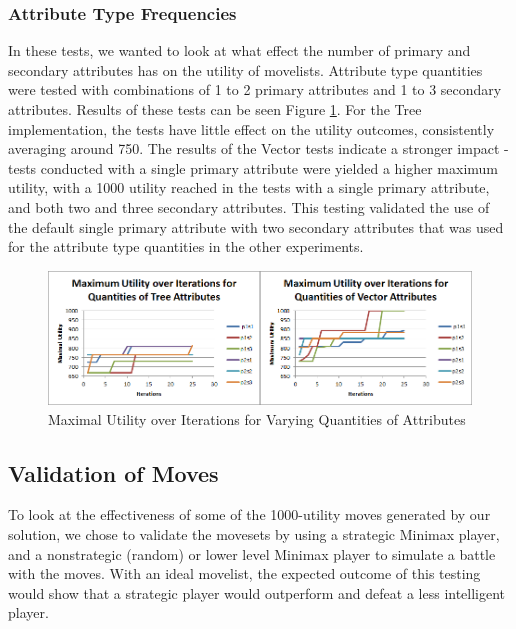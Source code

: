 \documentclass{acm_proc_article-sp}
\begin{document}
    \subsubsection{Attribute Type Frequencies}

In these tests, we wanted to look at what effect the number of primary and secondary attributes has on the utility of movelists. Attribute type quantities were tested with combinations of 1 to 2 primary attributes and 1 to 3 secondary attributes. Results of these tests can be seen Figure \ref{attribute_frequency_experiments}. For the Tree implementation, the tests have little effect on the utility outcomes, consistently averaging around 750. The results of the Vector tests indicate a stronger impact - tests conducted with a single primary attribute were yielded a higher maximum utility, with a 1000 utility reached in the tests with a single primary attribute, and both two and three secondary attributes. This testing validated the use of the default single primary attribute with two secondary attributes that was used for the attribute type quantities in the other experiments.

\begin{figure}[Ht]
    \centering
    \includegraphics[width=\textwidth,keepaspectratio]{./images/attr_frquency_comparison.png}
    \caption{Maximal Utility over Iterations for Varying Quantities of Attributes}
    \label{attribute_frequency_experiments}
\end{figure}
    
    \subsection{Validation of Moves}

To look at the effectiveness of some of the 1000-utility moves generated by our solution, we chose to validate the movesets by using a strategic Minimax player, and a nonstrategic (random) or lower level Minimax player to simulate a battle with the moves. With an ideal movelist, the expected outcome of this testing would show that a strategic player would outperform and defeat a less intelligent player.
\end{document}
